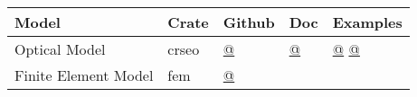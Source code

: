 \begin{longtable}[]{@{}lllll@{}}
\toprule
\begin{minipage}[b]{0.17\columnwidth}\raggedright
Model\strut
\end{minipage} & \begin{minipage}[b]{0.17\columnwidth}\raggedright
Crate\strut
\end{minipage} & \begin{minipage}[b]{0.20\columnwidth}\raggedright
Github\strut
\end{minipage} & \begin{minipage}[b]{0.10\columnwidth}\raggedright
Doc\strut
\end{minipage} & \begin{minipage}[b]{0.23\columnwidth}\raggedright
Examples\strut
\end{minipage}\tabularnewline
\midrule
\endhead
\begin{minipage}[t]{0.17\columnwidth}\raggedright
Optical Model\strut
\end{minipage} & \begin{minipage}[t]{0.17\columnwidth}\raggedright
crseo\strut
\end{minipage} & \begin{minipage}[t]{0.20\columnwidth}\raggedright
  \href{https://github.com/rconan/crseo}{@}
  \strut
\end{minipage} & \begin{minipage}[t]{0.10\columnwidth}\raggedright
  \href{https://rconan.github.io/crseo}{@}
\strut
\end{minipage} & \begin{minipage}[t]{0.23\columnwidth}\raggedright
\href{https://github.com/rconan/dos-guide/tree/main/examples/optical-model/gmt\_optical\_model}{@}
\href{https://github.com/rconan/dos-guide/tree/main/examples/optical-model/gmt\_optical\_sensor\_model}{@}\strut
\end{minipage}\tabularnewline
\begin{minipage}[t]{0.17\columnwidth}\raggedright
Finite Element Model\strut
\end{minipage} & \begin{minipage}[t]{0.17\columnwidth}\raggedright
fem\strut
\end{minipage} & \begin{minipage}[t]{0.20\columnwidth}\raggedright
  \href{https://github.com/rconan/fem}{@}
\strut
\end{minipage} & \begin{minipage}[t]{0.10\columnwidth}\raggedright

\end{minipage}
\end{longtable}
